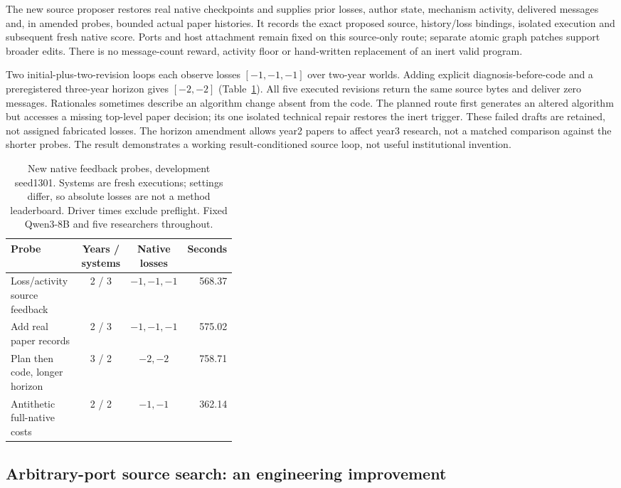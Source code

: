 The new source proposer restores real native checkpoints and supplies prior
losses, author state, mechanism activity, delivered messages and, in amended
probes, bounded actual paper histories. It records the exact proposed source,
history/loss bindings, isolated execution and subsequent fresh native score.
Ports and host attachment remain fixed on this source-only route; separate
atomic graph patches support broader edits. There is no message-count reward,
activity floor or hand-written replacement of an inert valid program.

Two initial-plus-two-revision loops each observe losses $[-1,-1,-1]$ over
two-year worlds. Adding explicit diagnosis-before-code and a preregistered
three-year horizon gives $[-2,-2]$ (Table~\ref{tab:native-feedback}). All five
executed revisions return the same source bytes and deliver zero messages.
Rationales sometimes describe an algorithm change absent from the code.
The planned route first generates an altered algorithm but accesses a missing
top-level paper decision; its one isolated technical repair restores the inert
trigger. These failed drafts are retained, not assigned fabricated losses.
The horizon amendment allows year2 papers to affect year3 research, not a
matched comparison against the shorter probes. The result demonstrates a
working result-conditioned source loop, not useful institutional invention.

\begin{table}[ht]
\caption{New native feedback probes, development seed1301. Systems are fresh
executions; settings differ, so absolute losses are not a method leaderboard.
Driver times exclude preflight. Fixed Qwen3-8B and five researchers throughout.}
\label{tab:native-feedback}
\centering\small
\begin{tabular}{p{0.37\linewidth}ccr}
\toprule
Probe & Years / systems & Native losses & Seconds \\
\midrule
Loss/activity source feedback & 2 / 3 & $-1,-1,-1$ & 568.37 \\
Add real paper records & 2 / 3 & $-1,-1,-1$ & 575.02 \\
Plan then code, longer horizon & 3 / 2 & $-2,-2$ & 758.71 \\
Antithetic full-native costs & 2 / 2 & $-1,-1$ & 362.14 \\
\bottomrule
\end{tabular}
\end{table}

\subsection{Arbitrary-port source search: an engineering improvement}

